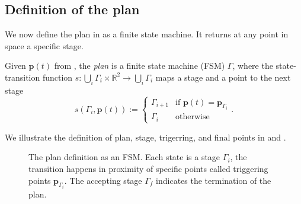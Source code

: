 \subsection{Definition of the plan}
\label{sec:plan}

We now define the plan in  as a finite state machine. It returns at any point in space a specific stage.

\begin{highlight}  
  \begin{defn}[Plan]\label{def:plan}
    Given $\mathbf{p}(t)$ from , the \emph{plan} is a finite state machine (FSM) $\Gamma$, where the state-transition function $s:\bigcup_i{\Gamma_i}\times\mathbb{R}^2\rightarrow\bigcup_i{\Gamma_i}$ maps a stage and a point to the next stage
    \begin{equation*}s(\Gamma_i,\mathbf{p}(t)):=\begin{cases}
      \Gamma_{i+1} & \text{if }\mathbf{p}(t)=\mathbf{p}_{\Gamma_i}\\
      \Gamma_i & \text{otherwise}
    \end{cases}.\end{equation*}
  \end{defn}
\end{highlight}

We illustrate the definition of plan, stage, trigerring, and final points in  and .

\begin{figure}[h]
  \center
  \caption[The plan definition]{The plan definition as an FSM. Each state is a stage $\Gamma_i$, the transition happens in proximity of specific points called triggering points $\mathbf{p}_{\Gamma_i}$. The accepting stage $\Gamma_f$ indicates the termination of the plan.}
  \label{fig:state-machine}
\end{figure}

